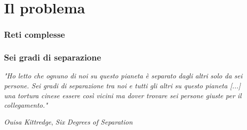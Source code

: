 \section{Il problema}

\begin{frame}
	\sectionpage
	\centering
\end{frame}

\begin{frame}
	\frametitle{Reti complesse}
	\centering
\end{frame}

\begin{frame}
	\frametitle{Sei gradi di separazione}
	\textit{"Ho letto che ognuno di noi su questo pianeta è separato dagli altri solo da sei persone. 
		Sei gradi di separazione tra noi e tutti gli altri su questo pianeta [...]\\ una tortura cinese essere così vicini ma dover trovare sei persone giuste per il collegamento."}
	\begin{flushright}
		\small \textit{Ouisa Kittredge}, \textit{Six Degrees of Separation}
	\end{flushright}

	

\end{frame}
